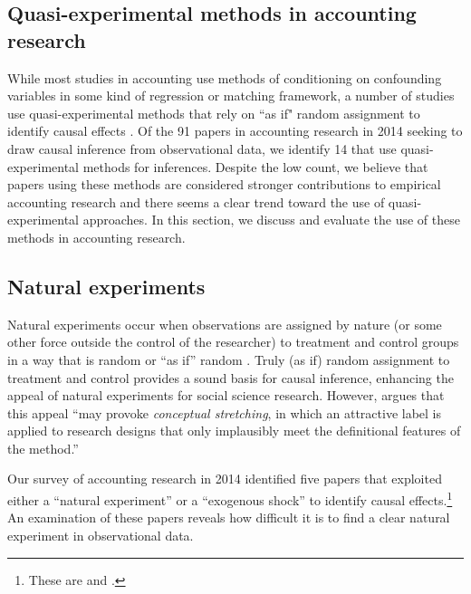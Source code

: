 \documentclass[11pt,reqno,titlepage]{amsart}
\begin{document}
\begin{doublespace}
\section{Quasi-experimental methods in accounting research} \label{sec:quasi}
While most studies in accounting use methods of conditioning on confounding variables in some kind of regression or matching framework, a number of studies use quasi-experimental methods that rely on ``as if" random assignment to identify causal effects \citep{Dunning:2012tt}.
Of the 91 papers in accounting research in 2014 seeking to draw causal inference from observational data, we identify 14 that use quasi-experimental methods for inferences. Despite the low count, we believe that papers using these methods are considered stronger contributions to empirical accounting research and there seems a clear trend toward the use of quasi-experimental approaches.
In this section, we discuss and evaluate the use of these methods in accounting research.

\subsection{Natural experiments}
Natural experiments occur when observations are assigned by nature (or some other force outside the control of the researcher) to treatment and control groups in a way that is random or ``as if'' random \citep{Dunning:2012tt}. 
Truly (as if) random assignment to treatment and control provides a sound basis for causal inference, enhancing the appeal of natural experiments for social science research.
However, \citet[\,p.3, emphasis added]{Dunning:2012tt} argues that this appeal ``may provoke \emph{conceptual stretching}, in which an attractive label is applied to research designs that only implausibly meet the definitional features of the method.'' 

Our survey of accounting research in 2014 identified five papers that exploited either a ``natural experiment'' or a ``exogenous shock'' to identify causal effects.\footnote{These are \citet{Lo:2013jk,Aier:2014ii,Kirk:2014gx,Houston:2014hv} and \citet{Hail:2014fq}.}
An examination of these papers reveals how difficult it is to find a clear natural experiment in observational data.


\end{doublespace}
\end{document}
